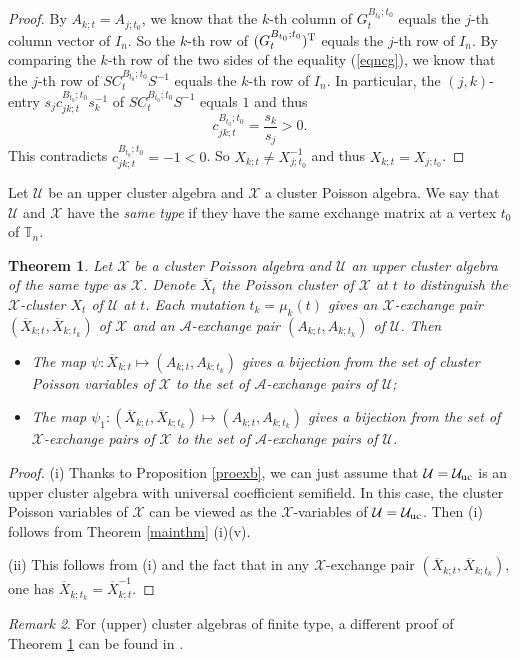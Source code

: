 \documentclass{amsart}
\newtheorem{theorem}{Theorem}[section]
\theoremstyle{definition}
\theoremstyle{remark}
\newtheorem{remark}[theorem]{Remark}
\numberwithin{equation}{section}
\begin{document}
\begin{proof}
 By $A_{k;t}=A_{j;t_0}$, we know that the $k$-th column  of $G_t^{B_{t_0};t_0}$ equals the $j$-th column vector of $I_n$. So the $k$-th row of $(G_t^{B_{t_0};t_0})^{\rm T}$ equals the $j$-th row of $I_n$. By comparing the $k$-th row of the two sides of the equality (\ref{eqncg}), we know that the $j$-th row of $SC_t^{B_{t_0};t_0}S^{-1}$ equals the $k$-th row of $I_n$. In particular, the $(j,k)$-entry $s_jc_{jk;t}^{B_{t_0};t_0}s_{k}^{-1}$ of $SC_t^{B_{t_0};t_0}S^{-1}$ equals $1$ and thus $$c_{jk;t}^{B_{t_0};t_0}=\frac{s_{k}}{s_j}>0.$$
 This contradicts $c_{jk;t}^{B_{t_0};t_0}=-1<0$. So $X_{k;t}\neq X_{j;t_0}^{-1}$ and thus  $X_{k;t}=X_{j;t_0}$.
\end{proof}



Let $\mathcal U$ be an upper cluster algebra and $\mathcal X$ a cluster Poisson algebra. We say that $\mathcal U$ and $\mathcal X$ have the {\em same type} if they have the same exchange matrix at a vertex $t_0$ of $\mathbb T_n$.

\begin{theorem}\label{thmbij}
Let $\mathcal X$ be a cluster Poisson algebra and $\mathcal U$ an upper cluster algebra of the same type as $\mathcal X$. Denote $\overline X_t$  the Poisson cluster of $\mathcal X$ at $t$ to distinguish the $\mathscr X$-cluster $X_t$ of $\mathcal U$ at $t$. Each mutation $t_k=\mu_k(t)$ gives an $\mathscr X$-exchange pair $(\overline X_{k;t},\overline X_{k;t_k})$ of $\mathcal X$ and an $\mathscr A$-exchange pair $(A_{k;t},A_{k;t_k})$ of $\mathcal U$. Then

\begin{itemize}
\item[(i)] The map $\psi:\overline X_{k;t}\mapsto (A_{k;t},A_{k;t_k})$ gives a bijection from the set of cluster Poisson variables of $\mathcal X$ to the set of  $\mathscr A$-exchange pairs of $\mathcal U$;


\item[(ii)] The map $\psi_1:(\overline X_{k;t}, \overline X_{k;t_k})\mapsto (A_{k;t},A_{k;t_k})$ gives a bijection from the set of $\mathscr X$-exchange pairs of $\mathcal X$ to  the set of $\mathscr A$-exchange pairs of $\mathcal U$.
\end{itemize}
\end{theorem}

\begin{proof}
(i) Thanks to Proposition \ref{proexb}, we can just assume that $\mathcal U=\mathcal U_{\rm uc}$ is an upper cluster algebra with universal coefficient semifield. In this case, the cluster Poisson variables of $\mathcal X$ can be viewed as the $\mathscr X$-variables of $\mathcal U=\mathcal U_{\rm uc}$. Then (i) follows from Theorem \ref{mainthm} (i)(v).

(ii) This follows from (i) and the fact that in any $\mathscr X$-exchange pair $(\overline X_{k;t},\overline X_{k;t_k})$, one has $\overline X_{k;t_k}=\overline X_{k;t}^{-1}$.
\end{proof}
\begin{remark}
For (upper) cluster algebras of finite type, a different proof of Theorem \ref{thmbij} can be found in \cite[Corollary 1.2]{S}.
\end{remark}
\end{document}
